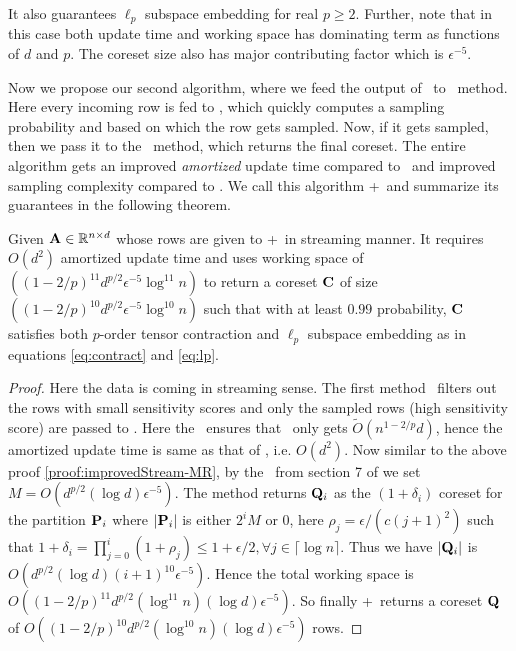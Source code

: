 It also guarantees $\ell_{p}$ subspace embedding for real $p \geq 2$. Further, note that in this case both update time and working space has dominating term as functions of $d$ and $p$. The coreset size also has major contributing factor which is $\epsilon^{-5}$.

Now we propose our second algorithm, where we feed the output of \online~to \mrlw~method. Here every incoming row is fed to \online, which quickly computes a sampling probability and based on which the row gets sampled. Now, if it gets sampled, then we pass it to the \mrlw~method, which returns the final coreset. The entire algorithm gets an improved {\em amortized} update time compared to \mrlw~and improved sampling complexity compared to \online. We call this algorithm \online+\mrlw~and summarize its guarantees in the following theorem.
% 
\begin{theorem}{\label{thm:improvedStream-MR}}
 Given $\mathbf{A} \in \mathbb{R}^{n \times d}$ whose rows are given to \online+\mrlw~in streaming manner. It requires $O(d^{2})$ amortized update time and uses working space of $((1-2/p)^{11}d^{p/2}\epsilon^{-5}\log^{11} n)$ to return a coreset $\mathbf{C}$ of size $((1-2/p)^{10}d^{p/2}\epsilon^{-5}\log^{10} n)$ such that with at least $0.99$ probability, $\mathbf{C}$ satisfies both $p$-order tensor contraction and $\ell_{p}$ subspace embedding as in equations \eqref{eq:contract} and \eqref{eq:lp}.
\end{theorem}
% 
\begin{proof}\label{proof:improvedStream-MR}
 Here the data is coming in streaming sense. The first method \online~filters out the rows with small sensitivity scores and only the sampled rows (high sensitivity score) are passed to \mrlw. Here the \online~ensures that \mrlw~only gets $\tilde{O}(n^{1-2/p}d)$, hence the amortized update time is same as that of \online, i.e. $O(d^{2})$. Now similar to the above proof \ref{proof:improvedStream-MR}, by the \mrlw~from section 7 of \cite{har2004coresets} we set $M=O(d^{p/2}(\log d)\epsilon^{-5})$. The method returns $\mathbf{Q}_{i}$ as the $(1 + \delta_{i})$ coreset for the partition $\mathbf{P}_{i}$ where $|\mathbf{P}_{i}|$ is either $2^{i}M$ or $0$, here $\rho_{j} = \epsilon/(c(j+1)^{2})$ such that $1+\delta_{i} = \prod_{j=0}^{i} (1 + \rho_{j}) \leq 1 + \epsilon/2, \forall j \in \lceil \log n \rceil$. Thus we have $|\mathbf{Q}_{i}|$ is $O(d^{p/2}(\log d)(i+1)^{10}\epsilon^{-5})$. Hence the total working space is $O((1-2/p)^{11}d^{p/2}(\log^{11} n)(\log d)\epsilon^{-5})$. So finally \online+\mrlw~returns a coreset $\mathbf{Q}$ of $O((1-2/p)^{10}d^{p/2}(\log^{10} n)(\log d)\epsilon^{-5})$ rows.
\end{proof}
